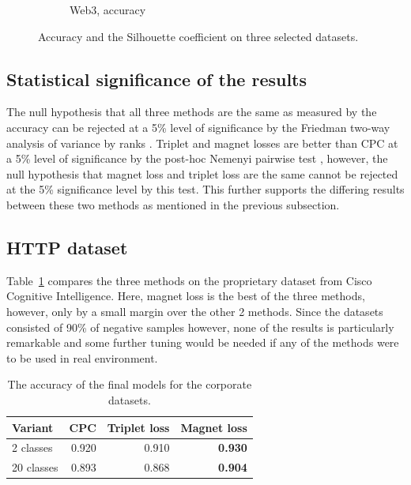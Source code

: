 \begin{figure}
\begin{subfigure}[t]{0.49\textwidth}
    \caption{Web3, accuracy}
  \end{subfigure}
  \caption{Accuracy and the Silhouette coefficient on three selected datasets.}\label{fig:public-comparison}
\end{figure}

\subsection{Statistical significance of the results}

The null hypothesis that all three methods are the same as measured by the accuracy can be rejected at a 5\% level of significance by the Friedman two-way analysis of variance by ranks \cite{friedman_use_1937}. Triplet and magnet losses are better than CPC at a 5\% level of significance by the post-hoc Nemenyi pairwise test \cite{nemenyi_distribution-free_1963}, however, the null hypothesis that magnet loss and triplet loss are the same cannot be rejected at the 5\% significance level by this test. This further supports the differing results between these two methods as mentioned in the previous subsection.

\subsection{HTTP dataset}

Table~\ref{tab:cisco-accuracy} compares the three methods on the proprietary dataset from Cisco Cognitive Intelligence. Here, magnet loss is the best of the three methods, however, only by a small margin over the other 2 methods. Since the datasets consisted of 90\% of negative samples however, none of the results is particularly remarkable and some further tuning would be needed if any of the methods were to be used in real environment.

\begin{table}
  \centering
  \begin{tabular}{lrrr}
    \toprule
    Variant    & CPC   & Triplet loss & Magnet loss \\
    \midrule
    2 classes  & 0.920 & 0.910        & \textbf{0.930} \\
    20 classes & 0.893 & 0.868        & \textbf{0.904} \\
    \bottomrule
  \end{tabular}
  \caption{The accuracy of the final models for the corporate datasets.}\label{tab:cisco-accuracy}
\end{table}

